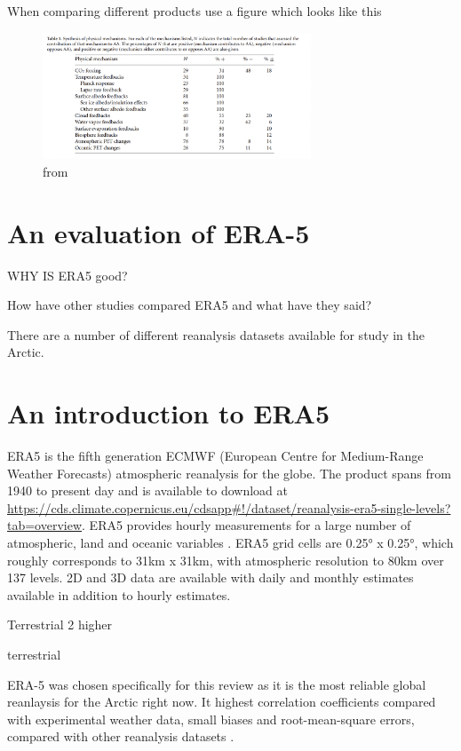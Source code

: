 \documentclass[11pt, oneside]{article}
\begin{document}
When comparing different products use a figure which looks like this 

\begin{figure}[ht]
    \centering
    \vspace{-4mm}
    \includegraphics[width=80mm]{previdi_comparasion_mechanisms.png}
    \vspace{-4mm}
    \caption{from \cite{previdi2021arctic} }
    \label{f:previdi2021arctic}
\end{figure}
\section{An evaluation of ERA-5}
WHY IS ERA5 good?

How have other studies compared ERA5 and what have they said?

There are a number of different reanalysis datasets available for study in the Arctic. 


\section{An introduction to ERA5}
ERA5 is the fifth generation ECMWF (European Centre for Medium-Range Weather Forecasts) atmospheric reanalysis for the globe. The product spans from 1940 to present day and is available to download at \url{https://cds.climate.copernicus.eu/cdsapp#!/dataset/reanalysis-era5-single-levels?tab=overview}. ERA5 provides hourly measurements for a large number of atmospheric, land and oceanic variables \cite{hersbach2020era5}. 
ERA5 grid cells are 0.25° x 0.25°, which roughly corresponds to 31km x 31km, with atmospheric resolution to 80km over 137 levels. 2D and 3D data are available with daily and monthly estimates available in addition to hourly estimates. 

Terrestrial
2
higher


terrestrial

ERA-5 was chosen specifically for this review as it is the most reliable global reanlaysis for the Arctic right now. It highest correlation coefficients compared with experimental weather data, small biases and root-mean-square errors, compared with other reanalysis datasets \cite{graham2019improved, hillebrand2021comparison}. 
\end{document}
